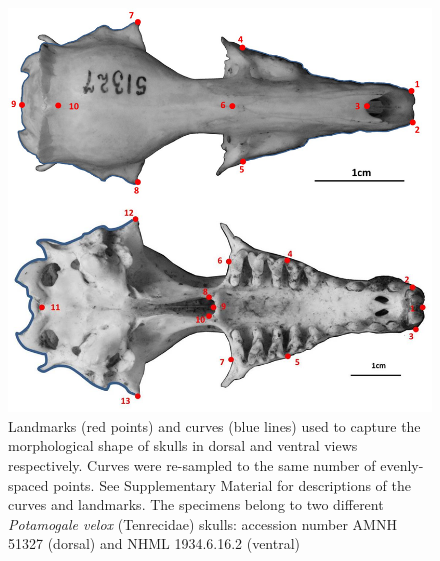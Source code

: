 \documentclass[12pt,a4paper]{article}
\begin{document}
	\begin{figure}
	\centering
	\includegraphics[width=1\linewidth]{figures/SkDors+Skvent_landmark_diagrams.png}
	
	\caption[Diagram of the landmarks and curves for the skulls in dorsal and ventral views]
		{Landmarks (red points) and curves (blue lines) used to capture the morphological shape of skulls in dorsal and ventral views respectively. Curves were re-sampled to the same number of evenly-spaced points. See Supplementary Material for descriptions of the curves and landmarks. The specimens belong to two different \textit{Potamogale velox} (Tenrecidae) skulls: accession number AMNH 51327 (dorsal) and NHML 1934.6.16.2 (ventral)}
	
	\label{fig:skdors_skvent_landmarks}
	\end{figure}
\end{document}
